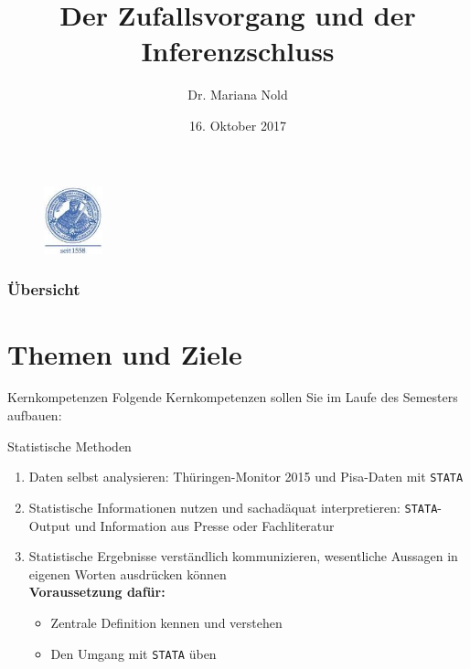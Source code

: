 \documentclass[usenames,dvipsnames,handout]{beamer}
\begin{document}
\author[Dr. Mariana Nold]{Dr. Mariana Nold}
 \date{}
\title [Deskriptive und Induktive Statistik]{Der Zufallsvorgang und der Inferenzschluss}
\date{16. Oktober 2017}
\begin{frame}
\maketitle

  \begin{figure}[ht]
 	\centering
 	      \includegraphics[width=0.15\textwidth]{index.jpeg}
 	\end{figure}
\end{frame} 

\begin{frame}
  \frametitle{Übersicht}
  \tableofcontents
\end{frame}

\section{Themen und Ziele }

\begin{frame}{Kernkompetenzen}
Folgende Kernkompetenzen sollen Sie im Laufe des Semesters aufbauen:
\begin{block}{Statistische Methoden}
\begin{enumerate}
\item{Daten selbst analysieren: Thüringen-Monitor 2015 und Pisa-Daten mit \texttt{STATA}}
\item{Statistische Informationen nutzen und sachadäquat interpretieren: \texttt{STATA}-Output und Information aus Presse oder Fachliteratur }
\item{Statistische Ergebnisse verständlich kommunizieren, wesentliche Aussagen in eigenen Worten ausdrücken können}\\
\vspace{0.5cm}
\textbf{Voraussetzung dafür:}
\begin{itemize}
\item{Zentrale Definition kennen und verstehen}
\item{Den Umgang mit \texttt{STATA} üben}
\end{itemize}
\end{enumerate}
\end{block}
\end{frame}
\end{document}
